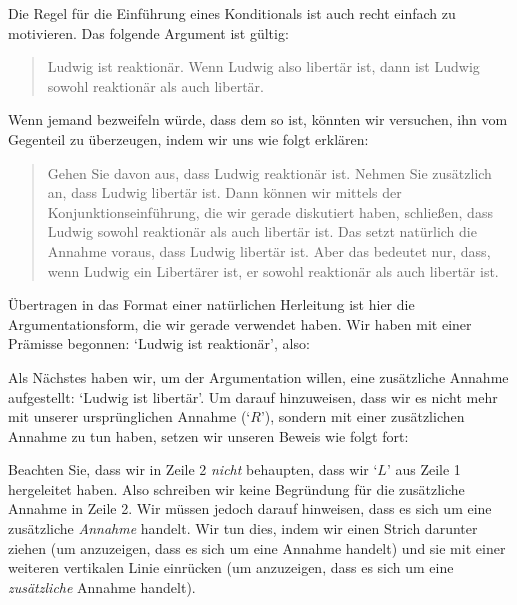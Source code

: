 Die Regel für die Einführung eines Konditionals ist auch recht einfach zu motivieren. Das folgende Argument ist gültig:
	\begin{quote}
		Ludwig ist reaktionär. Wenn Ludwig also libertär ist, dann ist Ludwig sowohl reaktionär als auch libertär. 	\end{quote}
Wenn jemand bezweifeln würde, dass dem so ist, könnten wir versuchen, ihn vom Gegenteil zu überzeugen, indem wir uns wie folgt erklären:	
	\begin{quote}
		Gehen Sie davon aus, dass Ludwig reaktionär ist. Nehmen Sie zusätzlich an, dass Ludwig libertär ist. Dann können wir mittels der Konjunktionseinführung, die wir gerade diskutiert haben, schlie{\ss}en, dass Ludwig sowohl reaktionär als auch libertär ist. Das setzt natürlich die Annahme voraus, dass Ludwig libertär ist. Aber das bedeutet nur, dass, wenn Ludwig ein Libertärer ist, er sowohl reaktionär als auch libertär ist.
	\end{quote}
Übertragen in das Format einer natürlichen Herleitung ist hier die Argumentationsform, die wir gerade verwendet haben. Wir haben mit einer Prämisse begonnen: `Ludwig ist reaktionär', also:
	\begin{fitchproof}
	\end{fitchproof}
Als Nächstes haben wir, um der Argumentation willen, eine zusätzliche Annahme aufgestellt: `Ludwig ist libertär'. Um darauf hinzuweisen, dass wir es nicht mehr mit unserer ursprünglichen Annahme (`$R$'), sondern mit einer zusätzlichen Annahme zu tun haben, setzen wir unseren Beweis wie folgt fort:
	\begin{fitchproof}
		\hypo{r}{R}
		\open
			\hypo{l}{L}
	\end{fitchproof}
Beachten Sie, dass wir in Zeile 2 \emph{nicht} behaupten, dass wir `$L$' aus Zeile 1 hergeleitet haben. Also schreiben wir keine Begründung für die zusätzliche Annahme in Zeile 2. Wir müssen jedoch darauf hinweisen, dass es sich um eine zusätzliche \emph{Annahme} handelt. Wir tun dies, indem wir einen Strich darunter ziehen (um anzuzeigen, dass es sich um eine Annahme handelt) und sie mit einer weiteren vertikalen Linie einrücken (um anzuzeigen, dass es sich um eine \emph{zusätzliche} Annahme handelt). 

